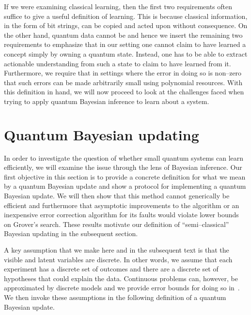 \documentclass[aps,amsmath,onecolumn,amssymb,notitlepage]{revtex4-1}
\begin{document}
If we were examining classical learning, then the first two requirements often suffice to give a useful definition of learning.  This is because classical information, in the form of bit strings, can be copied and acted upon without consequence.  On the other hand, quantum data cannot be and hence we insert the remaining two requirements to emphasize that in our setting one cannot claim to have learned a concept simply by owning a quantum state.  Instead, one has to be able to extract actionable understanding from such a state to claim to have learned from it.  Furthermore, we require that in settings where the error in doing so is non--zero that such errors can be made arbitrarily small using polynomial resources.  With this definition in hand, we will now proceed to look at the challenges faced when trying to apply quantum Bayesian inference to learn about a system.


\section{Quantum Bayesian updating}
In order to investigate the question of whether small quantum systems can learn efficiently, we will examine the issue through the lens of Bayesian inference.
Our first objective in this section is to provide a concrete definition for what we mean by a quantum Bayesian update and show a protocol for implementing a quantum Bayesian update.  We will then show that this method cannot generically be efficient and furthermore that asymptotic improvements to the algorithm or an inexpensive error correction algorithm for its faults would violate lower bounds on Grover's search.  These results motivate our definition of ``semi--classical'' Bayesian updating in the subsequent section.

 A key assumption that we make here and in the subsequent text is that the visible and latent variables are discrete.  In other words, we assume that each experiment has a discrete set of outcomes and there are a discrete set of hypotheses that could explain the data.    Continuous problems can, however, be approximated by discrete models and we provide error bounds for doing so in~.  We then invoke these assumptions in the following definition of a quantum Bayesian update.  
\end{document}
